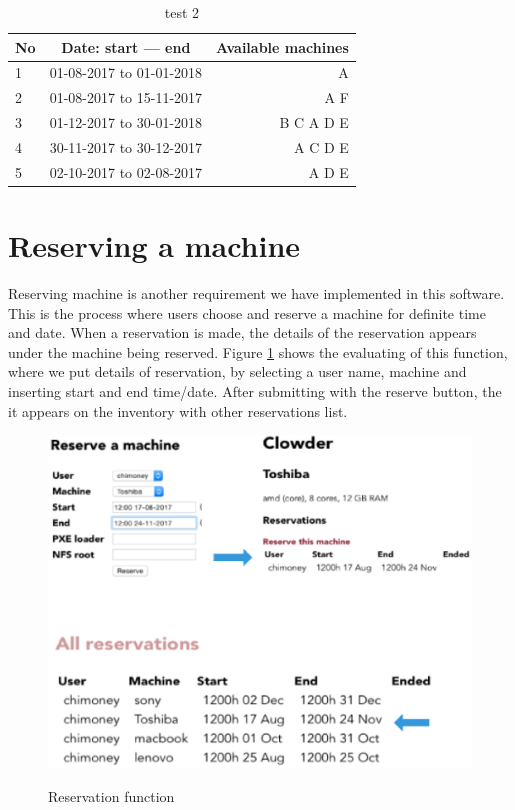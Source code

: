 \begin{table}[h!]
  \centering
  \label{tab:table1}
  \begin{tabular}{l|c||r}
    No & Date: start --- end & Available machines\\
    \hline
    1 &01-08-2017 to 01-01-2018  & A \\
    2 &01-08-2017 to 15-11-2017  & A F\\
    3 &01-12-2017 to 30-01-2018  & B C A D E \\
    4 &30-11-2017 to 30-12-2017  & A  C D E\\
    5 &02-10-2017 to 02-08-2017  & A  D E \\
  \end{tabular}
  \caption{test 2}
\end{table}
\pagebreak

\section*{Reserving a machine}
Reserving machine is another requirement we have implemented in this software. This is the process where users choose and reserve a machine for definite time and date. When a reservation is made, the details of the reservation appears under the machine being reserved. Figure \ref{fig:reserve} shows the evaluating of this function, where we put details of reservation, by selecting a user name, machine and inserting start and end time/date. After submitting with the reserve button, the it appears on the inventory with other reservations list. 
\begin{figure}[h]
  \includegraphics[width=\linewidth]{reserve.eps}
  \label{fig:reserve}
  \caption{Reservation function}
\end{figure}

